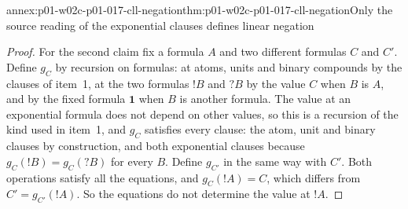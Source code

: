 \begin{annexitem}{annex:p01-w02c-p01-017-cll-negation}{thm:p01-w02c-p01-017-cll-negation}{Only the source reading of the exponential clauses defines linear negation}
\begin{proof}
For the second claim fix a formula \(A\) and two different formulas
\(C\) and \(C'\).  Define \(g_C\) by recursion on formulas: at atoms,
units and binary compounds by the clauses of item~1, at the two formulas
\(!B\) and \(?B\) by the value \(C\) when \(B\) is \(A\), and by the fixed
formula \(\mathbf 1\) when \(B\) is another formula.  The value at an
exponential formula does not depend on other values, so this is a
recursion of the kind used in item~1, and \(g_C\) satisfies every clause:
the atom, unit and binary clauses by construction, and both exponential
clauses because \(g_C(!B)=g_C(?B)\) for every \(B\).  Define \(g_{C'}\) in
the same way with \(C'\).  Both operations satisfy all the equations, and
\(g_C(!A)=C\), which differs from \(C'=g_{C'}(!A)\).  So the equations do
not determine the value at \(!A\).
\end{proof}
\end{annexitem}
